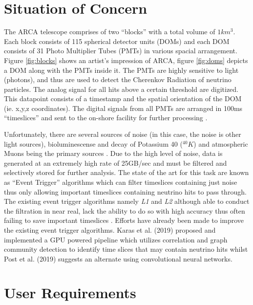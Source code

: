 \section{Situation of Concern}
\label{sec:soc}

The ARCA telescope comprises of two ``blocks'' with a total volume of
$1km^{3}$. Each block consists of 115 spherical detector units (DOMs)
and each DOM consists of 31 Photo Multiplier Tubes (PMTs) in various
spacial arrangement. Figure \ref{fig:blocks} shows an artist's
impression of ARCA, figure \ref{fig:doms} depicts a DOM along with the
PMTs inside it. The PMTs are highly sensitive to light (photons), and
thus are used to detect the Cherenkov Radiation of neutrino particles.
The analog signal for all hits above a certain threshold are
digitized. This datapoint consists of a timestamp and the spatial
orientation of the DOM (ie. x,y,z coordinates). The digital signals
from all PMTs are arranged in 100ms ``timeslices'' and sent to the
on-shore facility for further processing \cite{aiello2019km3net}.

Unfortunately, there are several sources of noise (in this case, the
noise is other light sources), bioluminescense and decay of Potassium
40 ($^{40}K$) and atmospheric Muons being the primary sources
\cite{post2019km3nnet}. Due to the high level of noise, data is
generated at an extremely high rate of 25GB/sec
\cite{adrian2016letter} and must be filtered and selectively stored
for further analysis. The state of the art for this task are known as
``Event Trigger'' algorithms \cite{adrian2016letter,aiello2019km3net}
which can filter timeslices containing just noise thus only allowing
important timeslices containing neutrino hits to pass through. The
existing event trigger algorithms namely \emph{L1} and \emph{L2}
although able to conduct the filtration in near real, lack the ability
to do so with high accuracy thus often failing to save important
timeslices \cite{karas2019data}. Efforts have already been made to
improve the existing event trigger algorithms. Karas et al. (2019)
proposed and implemented a GPU powered pipeline which utilizes
correlation and graph community detection to identify time slices that
may contain neutrino hits whilst Post et al. (2019) suggests an
alternate using convolutional neural networks.

\section{User Requirements}
\label{sec:user-req}

